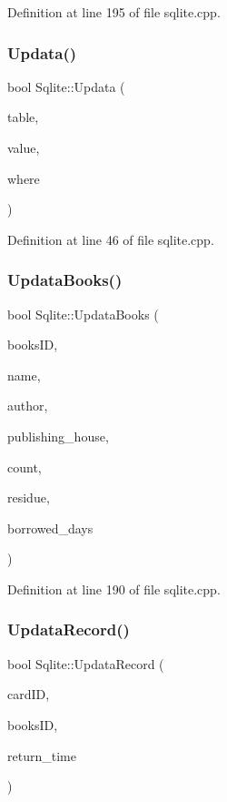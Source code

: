 Definition at line 195 of file sqlite.\+cpp.

\mbox{\label{class_sqlite_ae014031d1e0b0d9c412fb72ddc5a0043}} 
\subsubsection{\texorpdfstring{Updata()}{Updata()}}
{\footnotesize\ttfamily bool Sqlite\+::\+Updata (\begin{DoxyParamCaption}\item[{Q\+String}]{table,  }\item[{Q\+String}]{value,  }\item[{Q\+String}]{where }\end{DoxyParamCaption})}



Definition at line 46 of file sqlite.\+cpp.

\mbox{\label{class_sqlite_a6fc03a68c321e300dc540d0a48eabc70}} 
\subsubsection{\texorpdfstring{UpdataBooks()}{UpdataBooks()}}
{\footnotesize\ttfamily bool Sqlite\+::\+Updata\+Books (\begin{DoxyParamCaption}\item[{Q\+String}]{books\+ID,  }\item[{Q\+String}]{name,  }\item[{Q\+String}]{author,  }\item[{Q\+String}]{publishing\+\_\+house,  }\item[{int}]{count,  }\item[{int}]{residue,  }\item[{int}]{borrowed\+\_\+days }\end{DoxyParamCaption})}



Definition at line 190 of file sqlite.\+cpp.

\mbox{\label{class_sqlite_a5cb753f7b603cc450ef9527bf96d51f1}} 
\subsubsection{\texorpdfstring{UpdataRecord()}{UpdataRecord()}}
{\footnotesize\ttfamily bool Sqlite\+::\+Updata\+Record (\begin{DoxyParamCaption}\item[{Q\+String}]{card\+ID,  }\item[{Q\+String}]{books\+ID,  }\item[{Q\+String}]{return\+\_\+time }\end{DoxyParamCaption})}



